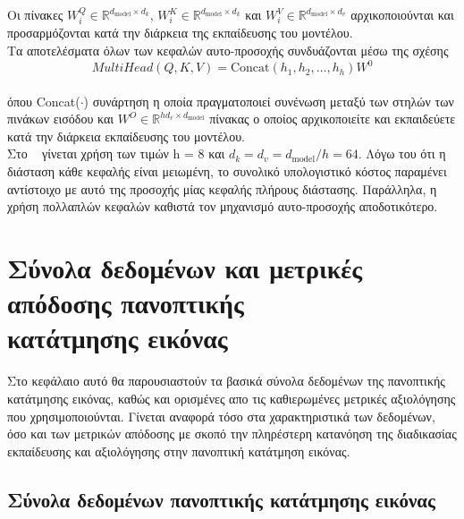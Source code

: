 \documentclass[12pt]{article}
\numberwithin{equation}{section}
\begin{document}
\noindent Οι πίνακες \( W_i^Q \in \mathbb{R}^{d_{\text{model}} \times d_k} \), \( W_i^K \in \mathbb{R}^{d_{\text{model}} \times d_k} \) και \( W_i^V \in \mathbb{R}^{d_{\text{model}} \times d_v} \) αρχικοποιούνται και προσαρμόζονται κατά την διάρκεια της εκπαίδευσης του μοντέλου.\\

\noindent Τα αποτελέσματα όλων των κεφαλών αυτο-προσοχής συνδυάζονται μέσω της σχέσης\\

\begin{equation}
MultiHead(Q, K, V) = \text{Concat}(h_1, h_2, \ldots, h_h) W^0
\end{equation}\\

\noindent όπου Concat(\(\cdot\)) συνάρτηση η οποία πραγματοποιεί συνένωση μεταξύ των στηλών των πινάκων εισόδου και \( W^O \in \mathbb{R}^{h d_v \times d_{\text{model}}} \) πίνακας ο οποίος αρχικοποιείτε και εκπαιδεύετε κατά την διάρκεια εκπαίδευσης του μοντέλου.\\

Στο ~\cite{vaswani2023attentionneed} γίνεται χρήση των τιμών h = 8 και \( d_k = d_v = d_{\text{model}} / h = 64 \). Λόγω του ότι η διάσταση κάθε κεφαλής είναι μειωμένη, το συνολικό υπολογιστικό κόστος παραμένει αντίστοιχο με αυτό της προσοχής μίας κεφαλής πλήρους διάστασης. Παράλληλα, η χρήση πολλαπλών κεφαλών καθιστά τον μηχανισμό αυτο-προσοχής αποδοτικότερο. \\



\newpage

\section{Σύνολα δεδομένων και μετρικές απόδοσης πανοπτικής \\ κατάτμησης εικόνας}

Στο κεφάλαιο αυτό θα παρουσιαστούν τα βασικά σύνολα δεδομένων της πανοπτικής κατάτμησης εικόνας, καθώς και ορισμένες απο τις καθιερωμένες μετρικές αξιολόγησης που χρησιμοποιούνται. Γίνεται αναφορά τόσο στα χαρακτηριστικά των δεδομένων, όσο και των μετρικών απόδοσης με σκοπό την πληρέστερη κατανόηση της διαδικασίας εκπαίδευσης και αξιολόγησης στην πανοπτική κατάτμηση εικόνας. \\

\subsection{Σύνολα δεδομένων πανοπτικής κατάτμησης εικόνας}
\end{document}
